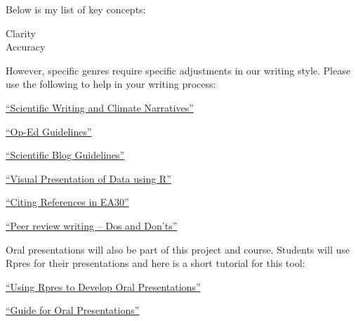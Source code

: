 \documentclass{article}\usepackage[]{graphicx}\usepackage[]{color}
\newenvironment{itemize*}%
  {\begin{itemize}%
    \setlength{\itemsep}{0pt}%
    \setlength{\parskip}{0pt}}%
  {\end{itemize}}
\begin{document}
Below is my list of key concepts:

\begin{description}
  \item[Clarity]
  \item[Accuracy]
\end{description}


However, specific genres require specific adjustments in our writing style. Please use the following to help in your writing process:

\begin{itemize*}
  \item \href{https://github.com/marclos/Climate_Change_Narratives/raw/master/Writing_Resources/Writing_About_Climate.pdf}{``Scientific Writing and Climate Narratives''}

  \item \href{https://github.com/marclos/Climate_Change_Narratives/raw/master/Writing_Resources/Op-Ed_Guidelines.pdf}{``Op-Ed Guidelines''}
  \item \href{https://github.com/marclos/Climate_Change_Narratives/raw/master/Writing_Resources/Scientific_Blog_Guidelines.pdf}{``Scientific Blog Guidelines''}
  \item \href{https://github.com/marclos/Climate_Change_Narratives/raw/master/Writing_Resources/Visualing_Data.pdf}{``Visual Presentation of Data using R''}
  \item \href{https://github.com/marclos/Climate_Change_Narratives/raw/master/Writing_Resources/Citing_Sources.pdf}{``Citing References in EA30''}
  \item \href{https://github.com/marclos/Climate_Change_Narratives/raw/master/Writing_Resources/Peer_Review-Dos_and_Donts.pdf}{``Peer review writing -- Dos and Don'ts''}
\end{itemize*}

Oral presentations will also be part of this project and course. Students will use Rpres for their presentations and here is a short tutorial for this tool:

\begin{itemize*}
  \item \href{https://github.com/marclos/Climate_Change_Narratives/raw/master/Writing_Resources/TBD.pdf}{``Using Rpres to Develop Oral Presentations''}
  \item \href{https://github.com/marclos/Climate_Change_Narratives/raw/master/Writing_Resources/TBD.pdf}{``Guide for Oral Presentations''}
\end{itemize*}
\end{document}

